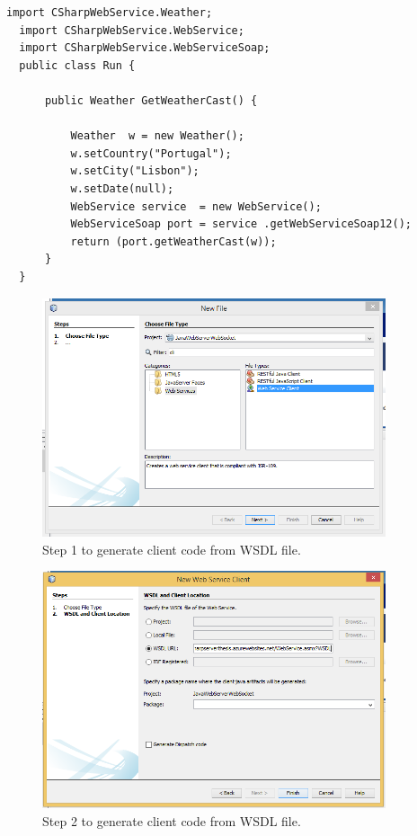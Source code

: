 \begin{lstlisting}[caption=SOAP Web Service Client with Java, label=lst:javaSOAP]
  import CSharpWebService.Weather;
  import CSharpWebService.WebService;
  import CSharpWebService.WebServiceSoap;
  public class Run {

      public Weather GetWeatherCast() {

          Weather  w = new Weather();
          w.setCountry("Portugal");
          w.setCity("Lisbon");
          w.setDate(null);
          WebService service  = new WebService();
          WebServiceSoap port = service .getWebServiceSoap12();
          return (port.getWeatherCast(w));
      }
  }

\end{lstlisting}

\begin{figure}[!htb]
  \centering
  \includegraphics[width=0.9\textwidth]{Figures/client1.png}
  \caption[Step 1 to generate client code from WSDL file.]{Step 1 to generate client code from WSDL file.}
  \label{fig:wsdlstep1}
\end{figure}
\begin{figure}[!htb]
  \centering
  \includegraphics[width=0.9\textwidth]{Figures/client2.png}
  \caption[Step 2 to generate client code from WSDL file.]{Step 2 to generate client code from WSDL file.}
  \label{fig:wsdlstep2}
\end{figure}

